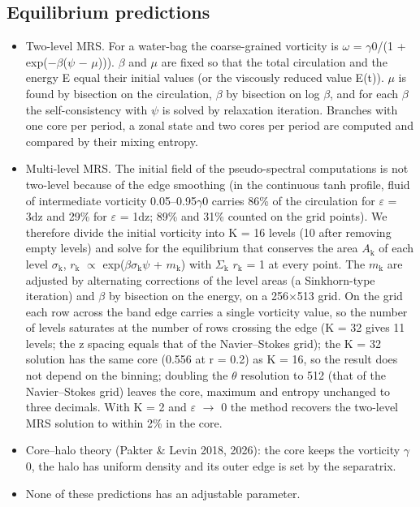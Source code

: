 \documentclass[11pt]{article}
\begin{document}
\subsection{Equilibrium predictions}
\begin{itemize}
\item Two-level MRS. For a water-bag the coarse-grained vorticity is $\omega{}$ = $\gamma{}$0/(1 + exp($-\beta{}$($\psi{}$ $-$ $\mu{}$))). $\beta{}$ and $\mu{}$ are fixed so that the total circulation and the energy E equal their initial values (or the viscously reduced value E(t)). $\mu{}$ is found by bisection on the circulation, $\beta{}$ by bisection on log $\beta{}$, and for each $\beta{}$ the self-consistency with $\psi{}$ is solved by relaxation iteration. Branches with one core per period, a zonal state and two cores per period are computed and compared by their mixing entropy.
\item Multi-level MRS. The initial field of the pseudo-spectral computations is not two-level because of the edge smoothing (in the continuous tanh profile, fluid of intermediate vorticity 0.05--0.95$\gamma{}$0 carries 86\% of the circulation for $\varepsilon{}$ = 3dz and 29\% for $\varepsilon{}$ = 1dz; 89\% and 31\% counted on the grid points). We therefore divide the initial vorticity into K = 16 levels (10 after removing empty levels) and solve for the equilibrium that conserves the area $A_{\mathrm{k}}$ of each level $\sigma{}_{\mathrm{k}}$, $r_{\mathrm{k}}$ $\propto{}$ exp($\beta{}\sigma{}_{\mathrm{k}}\psi{}$ + $m_{\mathrm{k}}$) with $\Sigma{}_{\mathrm{k}}$ $r_{\mathrm{k}}$ = 1 at every point. The $m_{\mathrm{k}}$ are adjusted by alternating corrections of the level areas (a Sinkhorn-type iteration) and $\beta{}$ by bisection on the energy, on a 256$\times{}$513 grid. On the grid each row across the band edge carries a single vorticity value, so the number of levels saturates at the number of rows crossing the edge (K = 32 gives 11 levels; the z spacing equals that of the Navier--Stokes grid); the K = 32 solution has the same core (0.556 at r = 0.2) as K = 16, so the result does not depend on the binning; doubling the $\theta{}$ resolution to 512 (that of the Navier--Stokes grid) leaves the core, maximum and entropy unchanged to three decimals. With K = 2 and $\varepsilon{}$ $\to{}$ 0 the method recovers the two-level MRS solution to within 2\% in the core.
\item Core--halo theory (Pakter \& Levin 2018, 2026): the core keeps the vorticity $\gamma{}$0, the halo has uniform density and its outer edge is set by the separatrix.
\item None of these predictions has an adjustable parameter.
\end{itemize}
\end{document}
